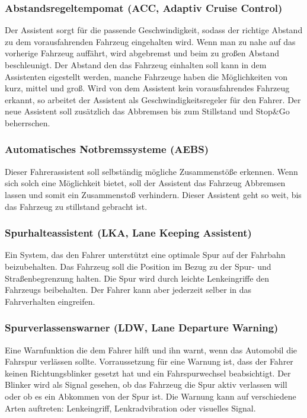         \subsubsection{Abstandsregeltempomat (ACC, Adaptiv Cruise Control)}
        Der Assistent sorgt für die passende Geschwindigkeit, sodass der richtige Abstand
        zu dem vorausfahrenden Fahrzeug eingehalten wird. Wenn man zu nahe auf das vorherige
        Fahrzeug auffährt, wird abgebremst und beim zu großen Abstand beschleunigt. Der Abstand
        den das Fahrzeug einhalten soll kann in dem Assistenten eigestellt werden, manche Fahrzeuge
        haben die Möglichkeiten von kurz, mittel und groß. Wird von dem Assistent kein vorausfahrendes
        Fahrzeug erkannt, so arbeitet der Assistent als Geschwindigkeitsregeler für den Fahrer. Der
        neue Assistent soll zusätzlich das Abbremsen bis zum Stillstand und Stop\&Go beherrschen.
        ~\cite{assistenzsysteme.PB2} ~\cite{Audi.PB1}

        \subsubsection{Automatisches Notbremssysteme (AEBS)}
        Dieser Fahrerassistent soll selbständig mögliche Zusammenstöße erkennen. Wenn sich solch
        eine Möglichkeit bietet, soll der Assistent das Fahrzeug Abbremsen lassen und somit ein
        Zusammenstoß verhindern. Dieser Assistent geht so weit, bis das Fahrzeug zu stillstand 
        gebracht ist.
        ~\cite{notbremsassi.PB1} ~\cite{assistenzsysteme.PB1}  ~\cite{assistenzsysteme.PB2}
        ~\cite{notbremsassi.PB2}
        
        \subsubsection{Spurhalteassistent (LKA, Lane Keeping Assistent)}
        Ein System, das den Fahrer unterstützt eine optimale Spur auf der Fahrbahn beizubehalten.
        Das Fahrzeug soll die Position im Bezug zu der Spur- und Straßenbegrenzung halten. Die
        Spur wird durch leichte Lenkeingriffe den Fahrzeugs beibehalten. Der Fahrer kann aber
        jederzeit selber in das Fahrverhalten eingreifen.
        ~\cite{spurhalte.PB1} ~\cite{assistenzsysteme.PB1} ~\cite{spurhalte.PB2}  ~\cite{assistenzsysteme.PB2}

        \subsubsection{Spurverlassenswarner (LDW, Lane Departure Warning)}
        Eine Warnfunktion die dem Fahrer hilft und ihn warnt, wenn das Automobil die Fahrspur
        verlässen sollte. Vorraussetzung für eine Warnung ist, dass der Fahrer keinen Richtungsblinker
        gesetzt hat und ein Fahrspurwechsel beabsichtigt. Der Blinker wird als Signal gesehen, ob das 
        Fahrzeug die Spur aktiv verlassen will oder ob es ein Abkommen von der Spur ist. Die 
        Warnung kann auf verschiedene Arten auftreten: Lenkeingriff, Lenkradvibration oder visuelles
        Signal.
        ~\cite{assistenzsysteme.PB2} ~\cite{LDW.PB1}

